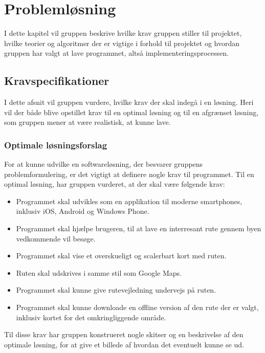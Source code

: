 \chapter{Problemløsning}
I dette kapitel vil gruppen beskrive hvilke krav gruppen stiller til projektet, hvilke teorier og algoritmer der er vigtige i forhold til projektet og hvordan gruppen har valgt at lave programmet, altså implementeringsprocessen.

\section{Kravspecifikationer}
I dette afsnit vil gruppen vurdere, hvilke krav der skal indegå i en løsning. Heri vil der både blive opstillet krav til en optimal løsning og til en afgrænset løsning, som gruppen mener at være realistisk, at kunne lave.

\subsection{Optimale løsningsforslag}
For at kunne udvilke en softwareløsning, der besvarer gruppens problemformulering, er det vigtigt at definere nogle krav til programmet. Til en optimal løsning, har gruppen vurderet, at der skal være følgende krav:
\begin{itemize}
	\item Programmet skal udvikles som en applikation til moderne smartphones, inklusiv iOS, Android og Windows Phone.
	\item Programmet skal hjælpe brugeren, til at lave en interresant rute gennem byen vedkommende vil besøge.
	\item Programmet skal vise et overskueligt og scalerbart kort med ruten.
	\item Ruten skal udskrives i samme stil som Google Maps.
	\item Programmet skal kunne give rutevejledning undervejs på ruten. 
	\item Programmet skal kunne  downloade en offline version af den rute der er valgt, inklusiv kortet for det omkringliggende område.
\end{itemize}
Til disse krav har gruppen konstrueret nogle skitser og en beskrivelse af den optimale løsning, for at give et billede af hvordan det eventuelt kunne se ud. \newpage

